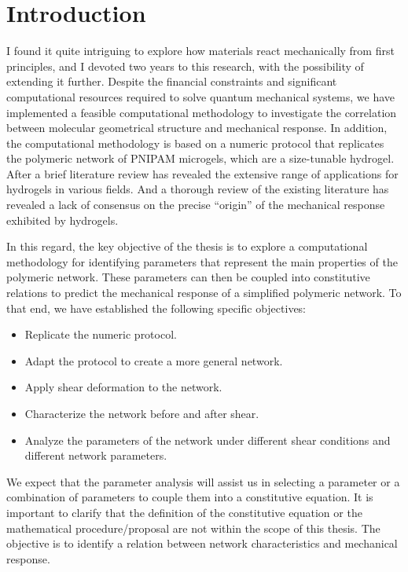 \chapter{Introduction}\label{ch1:Intro}



I found it quite intriguing to explore how materials react mechanically from first principles, and I devoted two years to this research, with the possibility of extending it further.
Despite the financial constraints and significant computational resources required to solve quantum mechanical systems, we have implemented a feasible computational methodology to investigate the correlation between molecular geometrical structure and mechanical response.
In addition, the computational methodology is based on a numeric protocol that replicates the polymeric network of PNIPAM microgels, which are a size-tunable hydrogel.
After a brief literature review has revealed the extensive range of applications for hydrogels in various fields.
And a thorough review of the existing literature has revealed a lack of consensus on the precise ``origin'' of the mechanical response exhibited by hydrogels.

In this regard, the key objective of the thesis is to explore a computational methodology for identifying parameters that represent the main properties of the polymeric network. 
These parameters can then be coupled into constitutive relations to predict the mechanical response of a simplified polymeric network.
To that end, we have established the following specific objectives:
\begin{itemize}
    \item Replicate the numeric protocol.
    \item Adapt the protocol to create a more general network.
    \item Apply shear deformation to the network.
    \item Characterize the network before and after shear.
    \item Analyze the parameters of the network under different shear conditions and different network parameters.
\end{itemize}
We expect that the parameter analysis will assist us in selecting a parameter or a combination of parameters to couple them into a constitutive equation.
It is important to clarify that the definition of the constitutive equation or the mathematical procedure/proposal are not within the scope of this thesis. 
The objective is to identify a relation between network characteristics and mechanical response.

